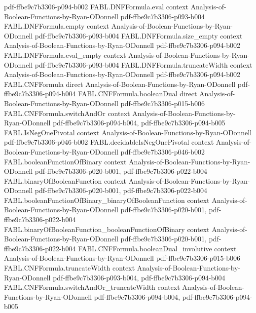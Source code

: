 \begin{theorem}
  {pdf-ffbe9c7b3306-p094-b002}
\proofstep
  {FABL.DNFFormula.eval}
  {context}
  {Analysis-of-Boolean-Functions-by-Ryan-ODonnell}
  {pdf-ffbe9c7b3306-p093-b004}
\proofstep
  {FABL.DNFFormula.empty}
  {context}
  {Analysis-of-Boolean-Functions-by-Ryan-ODonnell}
  {pdf-ffbe9c7b3306-p093-b004}
\proofstep
  {FABL.DNFFormula.size_empty}
  {context}
  {Analysis-of-Boolean-Functions-by-Ryan-ODonnell}
  {pdf-ffbe9c7b3306-p094-b002}
\proofstep
  {FABL.DNFFormula.eval_empty}
  {context}
  {Analysis-of-Boolean-Functions-by-Ryan-ODonnell}
  {pdf-ffbe9c7b3306-p093-b004}
\proofstep
  {FABL.DNFFormula.truncateWidth}
  {context}
  {Analysis-of-Boolean-Functions-by-Ryan-ODonnell}
  {pdf-ffbe9c7b3306-p094-b002}
\proofstep
  {FABL.CNFFormula}
  {direct}
  {Analysis-of-Boolean-Functions-by-Ryan-ODonnell}
  {pdf-ffbe9c7b3306-p094-b004}
\proofstep
  {FABL.CNFFormula.booleanDual}
  {direct}
  {Analysis-of-Boolean-Functions-by-Ryan-ODonnell}
  {pdf-ffbe9c7b3306-p015-b006}
\proofstep
  {FABL.CNFFormula.switchAndOr}
  {context}
  {Analysis-of-Boolean-Functions-by-Ryan-ODonnell}
  {pdf-ffbe9c7b3306-p094-b004,
    pdf-ffbe9c7b3306-p094-b005}
\proofstep
  {FABL.IsNegOnePivotal}
  {context}
  {Analysis-of-Boolean-Functions-by-Ryan-ODonnell}
  {pdf-ffbe9c7b3306-p046-b002}
\proofstep
  {FABL.decidableIsNegOnePivotal}
  {context}
  {Analysis-of-Boolean-Functions-by-Ryan-ODonnell}
  {pdf-ffbe9c7b3306-p046-b002}
\proofstep
  {FABL.booleanFunctionOfBinary}
  {context}
  {Analysis-of-Boolean-Functions-by-Ryan-ODonnell}
  {pdf-ffbe9c7b3306-p020-b001,
    pdf-ffbe9c7b3306-p022-b004}
\proofstep
  {FABL.binaryOfBooleanFunction}
  {context}
  {Analysis-of-Boolean-Functions-by-Ryan-ODonnell}
  {pdf-ffbe9c7b3306-p020-b001,
    pdf-ffbe9c7b3306-p022-b004}
\proofstep
  {FABL.booleanFunctionOfBinary_binaryOfBooleanFunction}
  {context}
  {Analysis-of-Boolean-Functions-by-Ryan-ODonnell}
  {pdf-ffbe9c7b3306-p020-b001,
    pdf-ffbe9c7b3306-p022-b004}
\proofstep
  {FABL.binaryOfBooleanFunction_booleanFunctionOfBinary}
  {context}
  {Analysis-of-Boolean-Functions-by-Ryan-ODonnell}
  {pdf-ffbe9c7b3306-p020-b001,
    pdf-ffbe9c7b3306-p022-b004}
\proofstep
  {FABL.CNFFormula.booleanDual_involutive}
  {context}
  {Analysis-of-Boolean-Functions-by-Ryan-ODonnell}
  {pdf-ffbe9c7b3306-p015-b006}
\proofstep
  {FABL.CNFFormula.truncateWidth}
  {context}
  {Analysis-of-Boolean-Functions-by-Ryan-ODonnell}
  {pdf-ffbe9c7b3306-p093-b004,
    pdf-ffbe9c7b3306-p094-b004}
\proofstep
  {FABL.CNFFormula.switchAndOr_truncateWidth}
  {context}
  {Analysis-of-Boolean-Functions-by-Ryan-ODonnell}
  {pdf-ffbe9c7b3306-p094-b004,
    pdf-ffbe9c7b3306-p094-b005}

\end{theorem}
